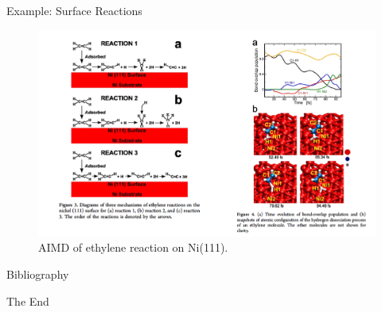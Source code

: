 \documentclass[aspectratio=169]{beamer}
\begin{document}
    \begin{frame}{Example: Surface Reactions}
        \begin{figure}
            \centering
            \includegraphics[width=0.6\linewidth]{lectures/figures/13-Surface_reactions.png}
            \caption{AIMD of ethylene reaction on Ni(111).\cite{arifinInitioMolecularDynamics2015}}
        \end{figure}
    \end{frame}


    \begin{frame}[allowframebreaks]{Bibliography}
        
        
    \end{frame}



    \begin{frame}
        \Huge{\centerline{The End}}
    \end{frame}
\end{document}
